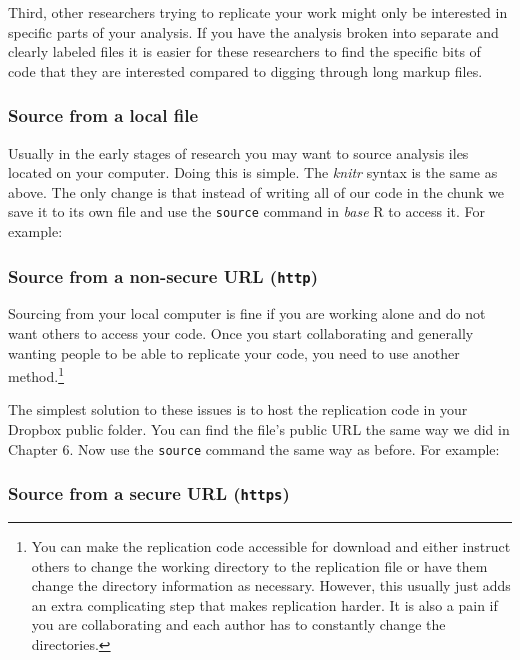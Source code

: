 \documentclass[ChapterTOCs,krantz1]{krantz}\usepackage{graphicx, color}
\begin{document}
Third, other researchers trying to replicate your work might only be
interested in specific parts of your analysis. If you have the analysis
broken into separate and clearly labeled files it is easier for these
researchers to find the specific bits of code that they are interested
compared to digging through long markup files.

\subsubsection{Source from a local file}

Usually in the early stages of research you may want to source analysis iles located on your computer. Doing this is simple. The {\emph{knitr}} syntax is the same as above. The only change is that instead of writing all of our code in the chunk we save it to its own file and use the \texttt{source} command in \emph{base} R to access it. For example:

\subsubsection{Source from a non-secure URL (\texttt{http})}

Sourcing from your local computer is fine if you are working alone and do not want others to access your code. Once you start collaborating and generally wanting people to be able to replicate your code, you need to
use another method.\footnote{You can make the replication code accessible for download and either instruct others to change the working directory to the replication file or have them change the directory information as necessary. However, this usually just adds an extra complicating step that makes replication harder. It is also a   pain if you are collaborating and each author has to constantly change the directories.}

The simplest solution to these issues is to host the replication code in your Dropbox public folder. You can find the file's public URL the same way we did in Chapter 6. Now use the \texttt{source} command the same way as before. For example:

\subsubsection{Source from a secure URL (\texttt{https})}
\end{document}
